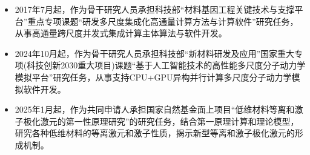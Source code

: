 \newpage
\vskip 10pt
\begin{itemize}
	\item 2017年7月起，作为骨干研究人员承担科技部“材料基因工程关键技术与支撑平台”重点专项课题“研发多尺度集成化高通量计算方法与计算软件”研究任务，从事高通量跨尺度并发式集成计算主体算法与软件开发。
	\item 2024年10月起，作为骨干研究人员承担科技部“新材料研发及应用”国家重大专项(科技创新2030重大项目)课题“基于人工智能技术的高性能多尺度分子动力学模拟平台”研究任务，从事支持CPU+GPU异构并行计算多尺度分子动力学模拟软件开发。
	\item 2025年1月起，作为共同申请人承担国家自然基金面上项目“低维材料等离和激子极化激元的第一性原理研究”的研究任务，结合第一原理计算和理论模型，研究各种低维材料的等离激元和激子性质，揭示新型等离和激子极化激元的形成机制。
\end{itemize}
\vskip 10pt
\vskip 10pt
{\fontsize{15.0pt}{10.0pt}\selectfont{\noindent 发表论文6篇，获得发明专利1项、软著2项、参与编著专著1部。}}
%
%



